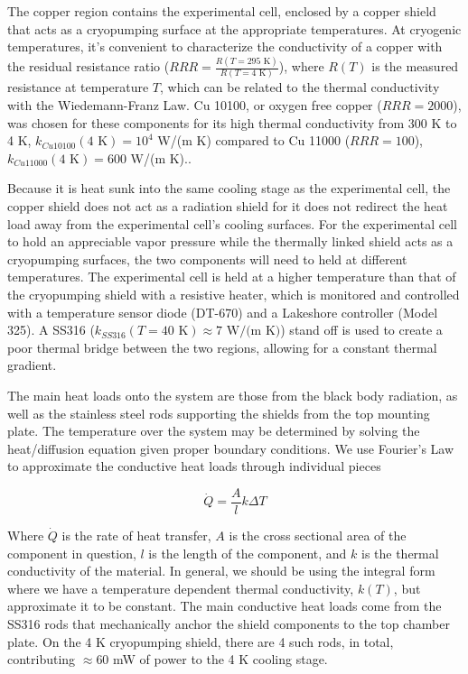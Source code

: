 The copper region contains the experimental cell, enclosed by a copper shield that acts as a cryopumping surface at the appropriate temperatures. At cryogenic temperatures, it's convenient to characterize the conductivity of a copper with the residual resistance ratio ($RRR=\frac{R(T=295\text{ K})}{R(T=4\text{ K})}$), where $R(T)$ is the measured resistance at temperature $T$, which can be related to the thermal conductivity with the Wiedemann-Franz Law.\cite{White2009} Cu 10100, or oxygen free copper ($RRR=2000$), was chosen for these components for its high thermal conductivity from 300 K to 4 K, $k_{Cu10100}(4\text{ K}) = 10^4$ W/(m K) compared to Cu 11000 ($RRR=100$), $k_{Cu11000}(4\text{ K}) = 600$ W/(m K).\cite{Simon1991}.

Because it is heat sunk into the same cooling stage as the experimental cell, the copper shield does not act as a radiation shield for it does not redirect the heat load away from the experimental cell's cooling surfaces. For the experimental cell to hold an appreciable vapor pressure while the thermally linked shield acts as a cryopumping surfaces, the two components will need to held at different temperatures. The experimental cell is held at a higher temperature than that of the cryopumping shield with a resistive heater, which is monitored and controlled with a temperature sensor diode (DT-670) and a Lakeshore controller (Model 325). A SS316 ($k_{SS316}(T=40\text{ K}) \approx 7\text{ W/(m K)}$) stand off is used to create a poor thermal bridge between the two regions, allowing for a constant thermal gradient.

The main heat loads onto the system are those from the black body radiation, as well as the stainless steel rods supporting the shields from the top mounting plate. The temperature over the system may be determined by solving the heat/diffusion equation given proper boundary conditions. We use Fourier's Law to approximate the conductive heat loads through individual pieces


\begin{equation}
	\dot{Q} = \frac{A}{l}k\Delta T
	\label{eq: fourier law}
\end{equation}

Where $\dot{Q}$ is the rate of heat transfer, $A$ is the cross sectional area of the component in question, $l$ is the length of the component, and $k$ is the thermal conductivity of the material. In general, we should be using the integral form where we have a temperature dependent thermal conductivity, $k(T)$, but approximate it to be constant. The main conductive heat loads come from the SS316 rods that mechanically anchor the shield components to the top chamber plate. On the 4 K cryopumping shield, there are 4 such rods, in total, contributing $\approx 60$ mW of power to the 4 K cooling stage.

